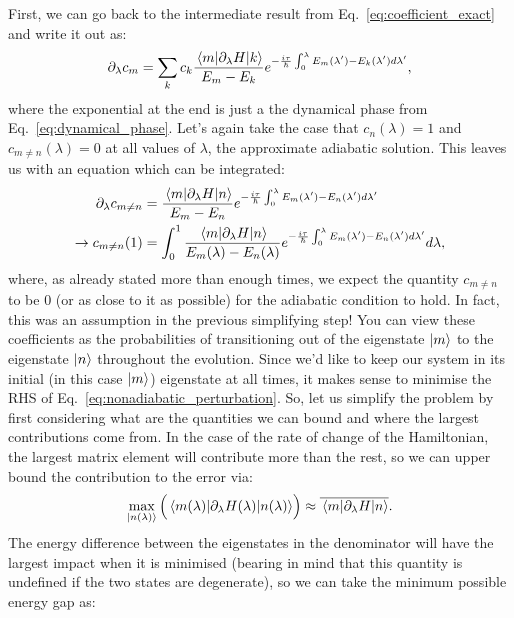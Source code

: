     First, we can go back to the intermediate result from Eq.~\eqref{eq:coefficient_exact} and write it out as:
    \begin{equation}\label{eq:perturbative_adiabatic}
        \partial_{\lambda} c_m = \sum_k c_k \frac{\mel{m}{\partial_{\lambda}H}{k}}{E_m - E_k} e^{-\frac{i \tau}{\hbar}\int_0^{\lambda} E_m(\lambda') - E_k(\lambda') d\lambda'},
    \end{equation}
    where the exponential at the end is just a the dynamical phase from Eq.~\eqref{eq:dynamical_phase}. Let's again take the case that $c_n(\lambda) = 1$ and $c_{m \neq n}(\lambda) = 0$ at all values of $\lambda$, the approximate adiabatic solution. This leaves us with an equation which can be integrated:
    \begin{equation}\label{eq:nonadiabatic_perturbation}
        \begin{aligned}
            \partial_{\lambda} c_{m \neq n} &= \frac{\mel{m}{\partial_{\lambda}H}{n}}{E_m - E_n} e^{-\frac{i \tau }{\hbar}\int_0^{\lambda} E_m(\lambda') - E_n(\lambda') d\lambda'} \\
            \rightarrow c_{m \neq n} (1) &= \int_0^1 \frac{\mel{m}{\partial_{\lambda}H}{n}}{E_m(\lambda) - E_n(\lambda)} e^{-\frac{i \tau }{\hbar}\int_0^{\lambda} E_m(\lambda') - E_n(\lambda') d\lambda'} d\lambda,
        \end{aligned}
    \end{equation}
    where, as already stated more than enough times, we expect the quantity $c_{m \neq n}$ to be $0$ (or as close to it as possible) for the adiabatic condition to hold. In fact, this was an assumption in the previous simplifying step! You can view these coefficients as the probabilities of transitioning out of the eigenstate $\ket{m}$ to the eigenstate $\ket{n}$ throughout the evolution. Since we'd like to keep our system in its initial (in this case $\ket{m}$) eigenstate at all times, it makes sense to minimise the RHS of Eq.~\eqref{eq:nonadiabatic_perturbation}. So, let us simplify the problem by first considering what are the quantities we can bound and where the largest contributions come from. In the case of the rate of change of the Hamiltonian, the largest matrix element will contribute more than the rest, so we can upper bound the contribution to the error via:
    \begin{equation}\label{eq:max_matrix_el}
        \max_{\ket{n(\lambda)}}\Big({\mel{m(\lambda)}{\partial_{\lambda}H(\lambda)}{n(\lambda)}}\Big) \approx \overline{\mel{m}{\partial_{\lambda}H}{n}}.
    \end{equation}
    The energy difference between the eigenstates in the denominator will have the largest impact when it is minimised (bearing in mind that this quantity is undefined if the two states are degenerate), so we can take the minimum possible energy gap as:
